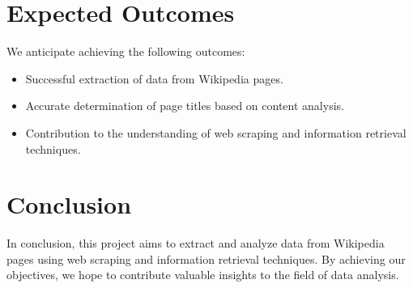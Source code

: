 \documentclass{article}
\begin{document}
\section{Expected Outcomes}
We anticipate achieving the following outcomes:
\begin{itemize}
    \item Successful extraction of data from Wikipedia pages.
    \item Accurate determination of page titles based on content analysis.
    \item Contribution to the understanding of web scraping and information retrieval techniques.
\end{itemize}

\section{Conclusion}
In conclusion, this project aims to extract and analyze data from Wikipedia pages using web scraping and information retrieval techniques. By achieving our objectives, we hope to contribute valuable insights to the field of data analysis.

% 
% 
\end{document}
